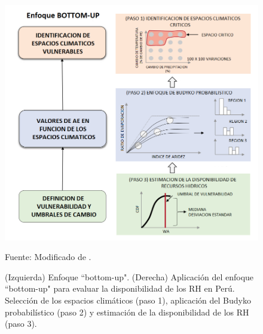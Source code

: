 \begin{figure}[ht!]
	\includegraphics[scale=0.57]{Images/Singh2015.png}
	\centering
	\caption{(Izquierda) Enfoque “bottom-up". (Derecha) Aplicación del enfoque “bottom-up" para evaluar la disponibilidad de los RH en Perú. Selección de los espacios climáticos (paso 1), aplicación del Budyko probabilístico (paso 2) y estimación de la disponibilidad de los RH (paso 3).}
	Fuente: Modificado de \citet{Singh2015}.
	\label{fig:Singh2015}
\end{figure}